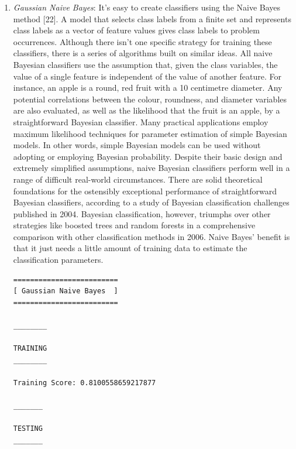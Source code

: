 \documentclass[conference]{IEEEtran}
\begin{document}
\begin{enumerate}
\item \textit{Gaussian Naive Bayes}: It's easy to create classifiers using the Naive Bayes method [22]. A model that selects class labels from a finite set and represents class labels as a vector of feature values gives class labels to problem occurrences. Although there isn't one specific strategy for training these classifiers, there is a series of algorithms built on similar ideas. All naive Bayesian classifiers use the assumption that, given the class variables, the value of a single feature is independent of the value of another feature. For instance, an apple is a round, red fruit with a 10 centimetre diameter. Any potential correlations between the colour, roundness, and diameter variables are also evaluated, as well as the likelihood that the fruit is an apple, by a straightforward Bayesian classifier. Many practical applications employ maximum likelihood techniques for parameter estimation of simple Bayesian models. In other words, simple Bayesian models can be used without adopting or employing Bayesian probability. Despite their basic design and extremely simplified assumptions, naive Bayesian classifiers perform well in a range of difficult real-world circumstances. There are solid theoretical foundations for the ostensibly exceptional performance of straightforward Bayesian classifiers, according to a study of Bayesian classification challenges published in 2004. Bayesian classification, however, triumphs over other strategies like boosted trees and random forests in a comprehensive comparison with other classification methods in 2006. Naive Bayes' benefit is that it just needs a little amount of training data to estimate the classification parameters. 
\begin{verbatim}
=========================
[ Gaussian Naive Bayes  ]
=========================

________

TRAINING
________

Training Score: 0.8100558659217877

_______

TESTING
_______


\end{verbatim}
\end{enumerate}
\end{document}
